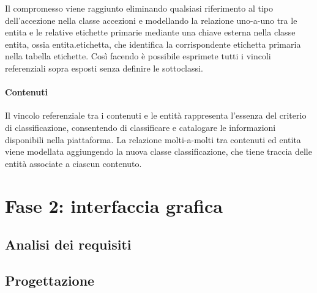 Il compromesso viene raggiunto eliminando qualsiasi riferimento al tipo dell'accezione nella classe \textsf{accezioni} e modellando la relazione uno-a-uno tra le entita e le relative etichette primarie mediante una chiave esterna nella classe \textsf{entita}, ossia \textsf{entita.etichetta}, che identifica la corrispondente etichetta primaria nella tabella \textsf{etichette}. Così facendo è possibile esprimete tutti i vincoli referenziali sopra esposti senza definire le sottoclassi.

\paragraph{Contenuti}
Il vincolo referenziale tra i contenuti e le entità rappresenta l'essenza del criterio di classificazione, consentendo di classificare e catalogare le informazioni disponibili nella piattaforma. La relazione molti-a-molti tra \textsf{contenuti} ed \textsf{entita} viene modellata aggiungendo la nuova classe \textsf{classificazione}, che tiene traccia delle entità associate a ciascun contenuto.

\section{Fase 2: interfaccia grafica}
\label{sec:tesi:stage:fase-2}

\subsection{Analisi dei requisiti}

\subsection{Progettazione}
